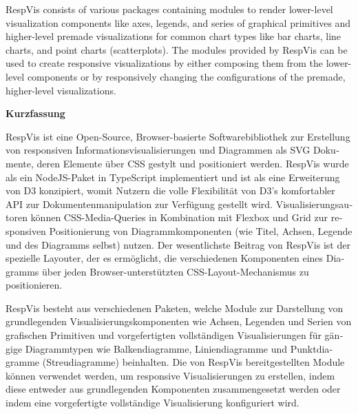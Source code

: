 RespVis consists of various packages containing modules to render
lower-level visualization components like axes, legends, and series of
graphical primitives and higher-level premade visualizations for
common chart types like bar charts, line charts, and point charts
(scatterplots). The modules provided by RespVis can be used to create
responsive visualizations by either composing them from the
lower-level components or by responsively changing the configurations
of the premade, higher-level visualizations.


\cleardoublepage

\vspace*{2cm}


\begin{otherlanguage}{austrian}

\begin{center}
    {\Large\sffamily\bfseries Kurzfassung}
\end{center}

RespVis ist eine Open-Source, Browser-basierte Softwarebibliothek zur
Erstellung von responsiven Informationsvisualisierungen und Diagrammen
als SVG Dokumente, deren Elemente über CSS gestylt und positioniert
werden. RespVis wurde als ein NodeJS-Paket in TypeScript implementiert
und ist als eine Erweiterung von D3 konzipiert,  womit Nutzern die
volle Flexibilität von D3's komfortabler API zur
Dokumentenmanipulation zur Verfügung gestellt wird.
Visualisierungsautoren können CSS-Media-Queries in Kombination mit
Flexbox und Grid zur responsiven Positionierung von
Diagrammkomponenten (wie Titel, Achsen, Legende und des Diagramms
selbst) nutzen. Der wesentlichste Beitrag von RespVis ist der
spezielle Layouter, der es ermöglicht, die verschiedenen Komponenten
eines Diagramms über jeden Browser-unterstützten
CSS-Layout-Mechanismus zu positionieren.

RespVis besteht aus verschiedenen Paketen, welche Module zur
Darstellung von grundlegenden Visualisierungskomponenten wie Achsen,
Legenden und Serien von grafischen Primitiven und vorgefertigten
vollständigen Visualisierungen für gängige Diagrammtypen wie
Balkendiagramme, Liniendiagramme und Punktdiagramme (Streudiagramme)
beinhalten. Die von RespVis bereitgestellten Module können verwendet
werden, um responsive Visualisierungen zu erstellen, indem diese
entweder aus grundlegenden Komponenten zusammengesetzt werden oder
indem eine vorgefertigte vollständige Visualisierung konfiguriert
wird.

\end{otherlanguage}



